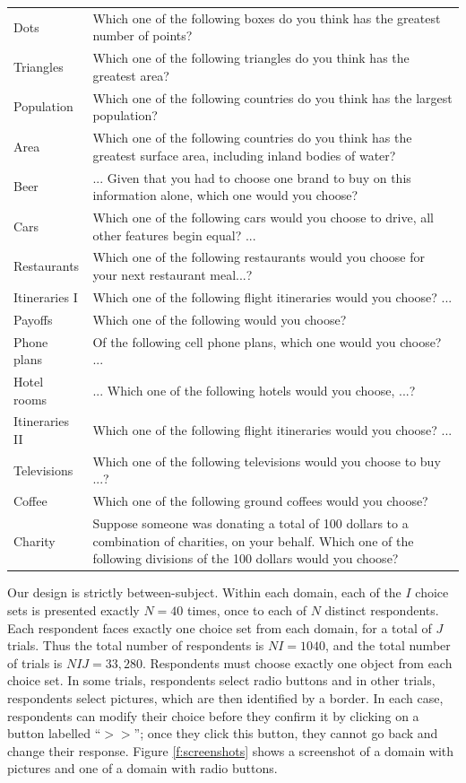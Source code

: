 \documentclass[11pt,letter]{article}
\begin{document}
\begin{table}[h!]
\begin{center}
\begin{small}
\begin{tabular}{lp{12cm}}
		Dots & Which one of the following boxes do you think has the greatest number of points? \\
		Triangles & Which one of the following triangles do you think has the greatest area? \\
		Population & Which one of the following countries do you think has the largest population? \\
		Area & Which one of the following countries do you think has the greatest surface area, including inland bodies of water? \\
		Beer & ... Given that you had to choose one brand to buy on this information alone, which one would you choose? \\
		Cars & Which one of the following cars would you choose to drive, all other features
begin equal? ... \\
		Restaurants & Which one of the following restaurants would you choose for your next restaurant meal...? \\
		Itineraries I & Which one of the following flight itineraries would you choose? ... \\
		Payoffs & Which one of the following would you choose? \\
		Phone plans & Of the following cell phone plans, which one would you choose? ... \\
		Hotel rooms & ... Which one of the following hotels would you choose, ...? \\
		Itineraries II & Which one of the following flight itineraries would you choose? ... \\
		Televisions & Which one of the following televisions would you choose to buy ...? \\
		Coffee & Which one of the following ground coffees would you choose? \\
		Charity & Suppose someone was donating a total of 100 dollars to a combination of charities,
on your behalf.
Which one of the following divisions of the 100 dollars would you choose? \\
    \end{tabular}
    \end{small}
  \end{center}
\end{table}

Our design is strictly between-subject.
Within each domain, each of the $I$ choice sets is presented exactly $N=40$ times, once to each of $N$ distinct respondents.
Each respondent faces exactly one choice set from each domain, for a total of $J$ trials.
Thus the total number of respondents is $NI=1040$, and the total number of trials is $NIJ=33,280$.
Respondents must choose exactly one object from each choice set.
In some trials, respondents select radio buttons and in other trials, respondents select pictures, which are then identified by a border.
In each case, respondents can modify their choice before they confirm it by clicking on a button labelled ``$>>$''; once they click this button, they cannot go back and change their response.
Figure \ref{f:screenshots} shows a screenshot of a domain with pictures and one of a domain with radio buttons.
\end{document}

